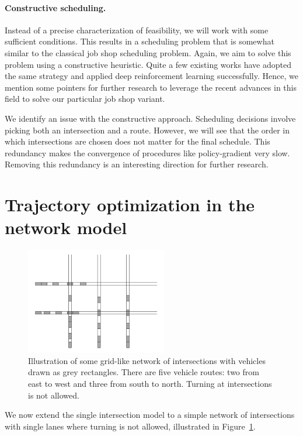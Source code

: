 \documentclass[a4paper]{report}
\theoremstyle{definition}
\theoremstyle{plain}
\begin{document}
\paragraph{Constructive scheduling.}

Instead of a precise characterization of feasibility, we will work with some sufficient conditions.
%
This results in a scheduling problem that is somewhat similar to the classical
job shop scheduling problem.
%
Again, we aim to solve this problem using a constructive heuristic. Quite a few
existing works have adopted the same strategy and applied deep reinforcement
learning successfully.
%
Hence, we mention some pointers for further research to leverage the recent
advances in this field to solve our particular job shop variant.

We identify an issue with the constructive approach. Scheduling decisions
involve picking both an intersection and a route. However, we will see that the
order in which intersections are chosen does not matter for the final schedule.
This redundancy makes the convergence of procedures like policy-gradient very
slow. Removing this redundancy is an interesting direction for further research.

\section{Trajectory optimization in the network model}

\begin{figure}
  \centering
  \includegraphics[width=0.55\textwidth]{figures/network/grid_example.png}
  \caption{Illustration of some grid-like network of intersections with vehicles
    drawn as grey rectangles. There are five vehicle routes: two from east to
    west and three from south to north. Turning at intersections is not
    allowed.}\label{fig:network_illustration}
\end{figure}

We now extend the single intersection model to a simple network of intersections
with single lanes where turning is not allowed, illustrated in
Figure~\ref{fig:network_illustration}.
\end{document}
